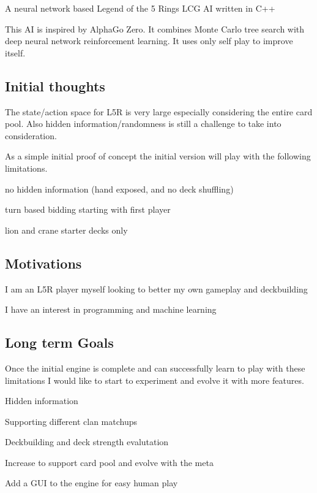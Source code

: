 A neural network based Legend of the 5 Rings L\+CG AI written in C++

This AI is inspired by Alpha\+Go Zero. It combines Monte Carlo tree search with deep neural network reinforcement learning. It uses only self play to improve itself.

\subsection*{Initial thoughts}

The state/action space for L5R is very large especially considering the entire card pool. Also hidden information/randomness is still a challenge to take into consideration.

As a simple initial proof of concept the initial version will play with the following limitations.
\begin{DoxyItemize}
\item no hidden information (hand exposed, and no deck shuffling)
\item turn based bidding starting with first player
\item lion and crane starter decks only
\end{DoxyItemize}

\subsection*{Motivations}


\begin{DoxyItemize}
\item I am an L5R player myself looking to better my own gameplay and deckbuilding
\item I have an interest in programming and machine learning
\end{DoxyItemize}

\subsection*{Long term Goals}

Once the initial engine is complete and can successfully learn to play with these limitations I would like to start to experiment and evolve it with more features.
\begin{DoxyItemize}
\item Hidden information
\item Supporting different clan matchups
\item Deckbuilding and deck strength evalutation
\item Increase to support card pool and evolve with the meta
\item Add a G\+UI to the engine for easy human play 
\end{DoxyItemize}